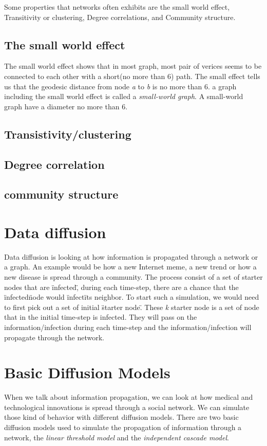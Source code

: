 Some properties that networks often exhibits are the small world effect, Transitivity or clustering, Degree correlations, and Community structure\cite{ComplexNetwork2003}.

\subsection{The small world effect}
The small world effect shows that in most graph, most pair of verices seems to be connected to each other with a short(no more than 6) path. The small effect tells us that the geodesic distance from node {\it a} to {\it b} is no more than 6. a graph including the small world effect is called a {\it small-world graph}. A small-world graph have a diameter no more than 6. 

\subsection{Transistivity/clustering}

\subsection{Degree correlation}

\subsection{community structure}



\section{Data diffusion}
Data diffusion is looking at how information is propagated through a network or a graph. An example would be how a new Internet meme, a new trend or how a new disease is spread through a community. The process consist of a set of starter nodes that are \"infected\", during each time-step, there are a chance that the \"infected\" node would \"infect\" its neighbor. To start such a simulation, we would need to first pick out a set of initial \"starter node\". These {\it k} starter node is a set of node that in the initial time-step is infected. They will pass on the information/infection during each time-step and the information/infection will propagate through the network.

\section{Basic Diffusion Models}
When we talk about information propagation, we can look at how medical and technological innovations is spread through a social network. We can simulate those kind of behavior with different diffusion models. There are two basic diffusion models used to simulate the propagation of information through a network\cite{MaximizeSpread2003}, the {\it linear threshold model} and the {\it independent cascade model}\cite{MaximizeSpread2003}.

